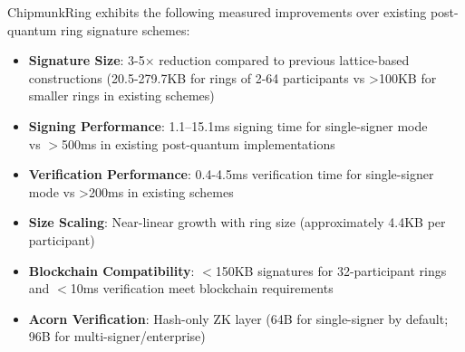 \documentclass[11pt,a4paper]{article}
\begin{document}
\begin{table}[h]
\centering
\small
\caption{Comparison with Existing Post-Quantum Ring Signatures}
\label{tab:comparison}
\end{table}

ChipmunkRing exhibits the following measured improvements over existing post-quantum ring signature schemes:

\begin{itemize}
\item \textbf{Signature Size}: 3-5× reduction compared to previous lattice-based constructions (20.5-279.7KB for rings of 2-64 participants vs >100KB for smaller rings in existing schemes)
\item \textbf{Signing Performance}: 1.1--15.1ms signing time for single-signer mode \\
vs $>$500ms in existing post-quantum implementations
\item \textbf{Verification Performance}: 0.4-4.5ms verification time for single-signer mode vs >200ms in existing schemes
\item \textbf{Size Scaling}: Near-linear growth with ring size (approximately 4.4KB per participant)
\item \textbf{Blockchain Compatibility}: $<$150KB signatures for 32-participant rings \\
and $<$10ms verification meet blockchain requirements
\item \textbf{Acorn Verification}: Hash-only ZK layer (64B for single-signer by default; 96B for multi-signer/enterprise)
\end{itemize}
\end{document}
